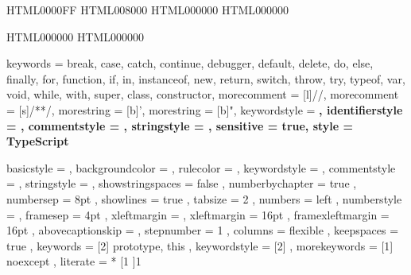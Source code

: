 
\usepackage{listings} 
\usepackage{accsupp}



\newcommand{\noncopynumber}[1]{%
    \BeginAccSupp{method=escape,ActualText={}}%
    #1%
    \EndAccSupp{}%
}

\makeatletter
\def\lst@outputspace{{\ifx\lst@bkgcolor\empty\color{white}\else\lst@bkgcolor\fi\lst@visiblespace}}
\makeatother


\definecolor{msvc_keyword}   {HTML}{0000FF} 
\definecolor{msvc_comment}   {HTML}{008000} 
\definecolor{msvc_frame}     {HTML}{000000}
\definecolor{msvc_string}    {HTML}{000000}

\definecolor{msvc_operators} {HTML}{000000}
\definecolor{msvc_stl}       {HTML}{000000}


{
    keywords        = {break, case, catch, continue, debugger, default, delete, do, else, finally, for, function, if, in, instanceof, new, return, switch, throw, try, typeof, var, void, while, with, super, class, constructor},
    morecomment     = [l]{//},
    morecomment     = [s]{/*}{*/},
    morestring      = [b]',
    morestring      = [b]", 
    keywordstyle    = \color{blue}\bfseries,
    identifierstyle = \color{black},
    commentstyle    = \color{teal}\ttfamily,
    stringstyle     = \color{red}\ttfamily,
    sensitive       = true,
    style           = TypeScript
}


{
    basicstyle       = 
\linespread{0.85}\ttfamily
\lst@ifdisplaystyle\scriptsize\fi %
%
,   backgroundcolor  = \color{msvc_background}
,   rulecolor        = \color{msvc_frame}
,   keywordstyle     = \lst@ifdisplaystyle\color{msvc_keyword}\fi
,   commentstyle     = \lst@ifdisplaystyle\color{msvc_comment}\fi
,   stringstyle      = \lst@ifdisplaystyle\color{msvc_string}\fi
,   showstringspaces = false
,   numberbychapter  = true
,   numbersep        =  8pt
,   showlines        = true
,   tabsize          =  2          
,   numbers          = left
,   numberstyle      = \tiny\color{msvc_linenumber}\noncopynumber
,   framesep         =  4pt
,   xleftmargin      = \parindent
,   xleftmargin      = 16pt
,   framexleftmargin = 16pt
,   abovecaptionskip = \medskipamount
,   stepnumber       = 1
,   columns          = flexible
,   keepspaces       = true
,	keywords         = [2]{ prototype, this }
,	keywordstyle     = [2]\lst@ifdisplaystyle\color{msvc_stl}\fi
,   morekeywords     = [1]{ noexcept }
,	literate         = *
{[}{{\lst@ifdisplaystyle\color{msvc_operators}\fi{[}}}{1}
{]}{{\lst@ifdisplaystyle\color{msvc_operators}\fi{]}}}{1}
}
